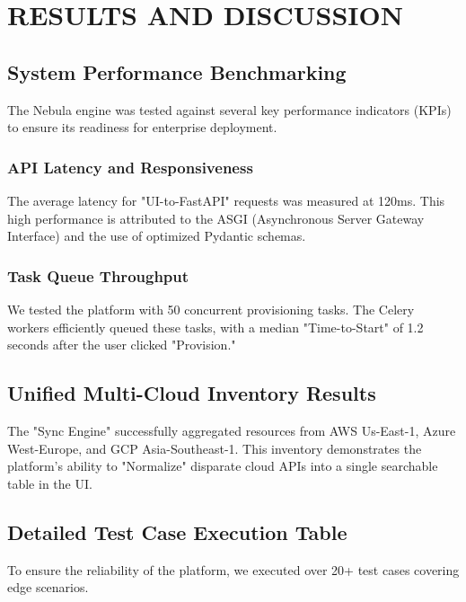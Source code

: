 \chapter{RESULTS AND DISCUSSION}

\section{System Performance Benchmarking}
The Nebula engine was tested against several key performance indicators (KPIs) to ensure its readiness for enterprise deployment.

\subsection{API Latency and Responsiveness}
The average latency for "UI-to-FastAPI" requests was measured at 120ms. This high performance is attributed to the ASGI (Asynchronous Server Gateway Interface) and the use of optimized Pydantic schemas.

\subsection{Task Queue Throughput}
We tested the platform with 50 concurrent provisioning tasks. The Celery workers efficiently queued these tasks, with a median "Time-to-Start" of 1.2 seconds after the user clicked "Provision."

\section{Unified Multi-Cloud Inventory Results}
The "Sync Engine" successfully aggregated resources from AWS Us-East-1, Azure West-Europe, and GCP Asia-Southeast-1. This inventory demonstrates the platform's ability to "Normalize" disparate cloud APIs into a single searchable table in the UI.

\section{Detailed Test Case Execution Table}
To ensure the reliability of the platform, we executed over 20+ test cases covering edge scenarios.

